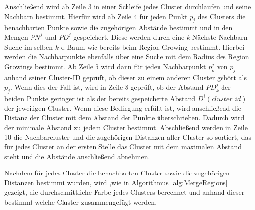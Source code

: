 Anschließend wird ab Zeile 3 in einer Schleife jedes Cluster durchlaufen und seine Nachbarn bestimmt. Hierfür wird ab Zeile 4 für jeden Punkt $p_j$ des Clusters die benachbarten Punkte sowie die zugehörigen Abstände bestimmt und in den Mengen $PN^j$ und $PD^j$ gespeichert. Diese werden durch eine $k$-Nächste-Nachbarn Suche im selben $k$-d-Baum wie bereits beim Region Growing bestimmt. Hierbei werden die Nachbarpunkte ebenfalls über eine Suche mit dem Radius des Region Growings bestimmt. Ab Zeile 6 wird dann für jeden Nachbarpunkt $p_k^j$ von $p_j$ anhand seiner Cluster-ID geprüft, ob dieser zu einem anderen Cluster gehört als $p_j$. Wenn dies der Fall ist, wird in Zeile 8 geprüft, ob der Abstand $PD_k^j$ der beiden Punkte geringer ist als der bereits gespeicherte Abstand $D^i(cluster\_id)$ der jeweiligen Cluster. Wenn diese Bedingung erfüllt ist, wird anschließend die Distanz der Cluster mit dem Abstand der Punkte überschrieben. Dadurch wird der minimale Abstand zu jedem Cluster bestimmt. Abschließend werden in Zeile 10 die Nachbarcluster und die zugehörigen Distanzen aller Cluster so sortiert, das für jedes Cluster an der ersten Stelle das Cluster mit dem maximalen Abstand steht und die Abstände anschließend abnehmen. 

Nachdem für jedes Cluster die benachbarten Cluster sowie die zugehörigen Distanzen bestimmt wurden, wird ,wie in Algorithmus \ref{alg:MergeRegions} gezeigt, die durchschnittliche Farbe jedes Clusters berechnet und anhand dieser bestimmt welche Cluster zusammengefügt werden. 

%								

